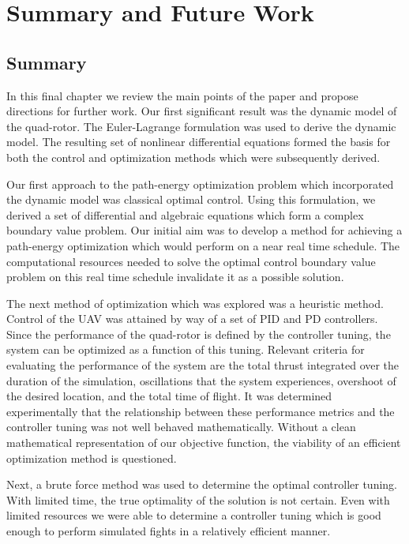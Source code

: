 
\chapter{Summary and Future Work} %

\label{Chapter8} 


\section{Summary}
In this final chapter we review the main points of the paper and propose directions for further work. Our first significant result was the dynamic model of the quad-rotor. The Euler-Lagrange formulation was used to derive the dynamic model. The resulting set of nonlinear differential equations formed the basis for both the control and optimization methods which were subsequently derived.

Our first approach to the path-energy optimization problem which incorporated the dynamic model was classical optimal control. Using this formulation, we derived a set of differential and algebraic equations which form a complex boundary value problem. Our initial aim was to develop a method for achieving a path-energy optimization which would perform on a near real time schedule. The computational resources needed to solve the optimal control boundary value problem on this real time schedule invalidate it as a possible solution.

The next method of optimization which was explored was a heuristic method. Control of the UAV was attained by way of a set of PID and PD controllers. Since the performance of the quad-rotor is defined by the controller tuning, the system can be optimized as a function of this tuning. Relevant criteria for evaluating the performance of the system are the total thrust integrated over the duration of the simulation, oscillations that the system experiences, overshoot of the desired location, and the total time of flight. It was determined experimentally that the relationship between these performance metrics and the controller tuning was not well behaved mathematically. Without a clean mathematical representation of our objective function, the viability of an efficient optimization method is questioned.

Next, a brute force method was used to determine the optimal controller tuning. With limited time, the true optimality of the solution is not certain. Even with limited resources we were able to determine a controller tuning which is good enough to perform simulated fights in a relatively efficient manner. 

